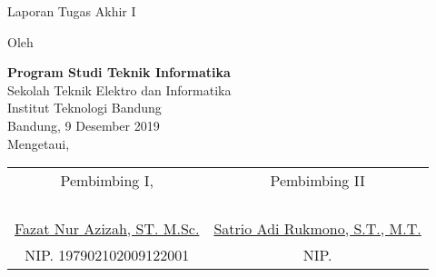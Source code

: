 \clearpage
\pagestyle{empty}

\begin{center}
\smallskip

    \Large \bfseries \MakeUppercase{\thetitle}
    \vfill

    \Large Laporan Tugas Akhir I
    \vfill

    \large Oleh

    \Large \theauthor

    \normalsize
    \textbf{Program Studi Teknik Informatika} \\
    Sekolah Teknik Elektro dan Informatika \\
    Institut Teknologi Bandung \\

    \vfill
    \normalsize \normalfont
    Bandung, 9 Desember 2019 \\
    Mengetaui,

    \vfill
    \setlength{\tabcolsep}{12pt}
    \begin{tabular}{c@{\hskip 0.5in}c}
        Pembimbing I, & Pembimbing II \\
        & \\
        & \\
        & \\
        & \\
        \underline{Fazat Nur Azizah, ST. M.Sc.} & \underline{Satrio Adi Rukmono, S.T., M.T.} \\
        NIP. 197902102009122001 & NIP.  \\
    \end{tabular}

\end{center}
\clearpage
